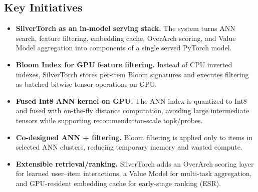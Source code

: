 \documentclass{article}
\begin{document}
\subsection*{Key Initiatives}
\begin{itemize}[leftmargin=1.5em]
  \item \textbf{SilverTorch as an in-model serving stack.} The system turns ANN search, feature filtering, embedding cache, OverArch scoring, and Value Model aggregation into components of a single served PyTorch model.
  \item \textbf{Bloom Index for GPU feature filtering.} Instead of CPU inverted indexes, SilverTorch stores per-item Bloom signatures and executes filtering as batched bitwise tensor operations on GPU.
  \item \textbf{Fused Int8 ANN kernel on GPU.} The ANN index is quantized to Int8 and fused with on-the-fly distance computation, avoiding large intermediate tensors while supporting recommendation-scale topk/probes.
  \item \textbf{Co-designed ANN + filtering.} Bloom filtering is applied only to items in selected ANN clusters, reducing temporary memory and wasted compute.
  \item \textbf{Extensible retrieval/ranking.} SilverTorch adds an OverArch scoring layer for learned user--item interactions, a Value Model for multi-task aggregation, and GPU-resident embedding cache for early-stage ranking (ESR).
\end{itemize}
\end{document}
